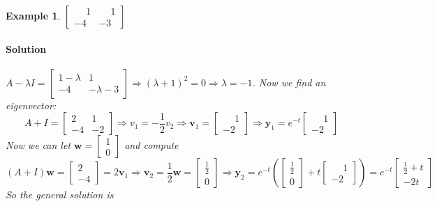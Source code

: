 \documentclass[letterpaper, 11pt, openany]{book}
\theoremstyle{mytheoremstyle}
\theoremstyle{myexamplestyle}
\newtheorem{example}{Example}[section]
\newenvironment{solution}{\paragraph{\sffamily \smaller \fontseries{b}\selectfont Solution}}{\hfill\faSquare}
\begin{document}
\begin{example}\label{e:de-rep-ev-neg}
    \(\begin{bmatrix}
         \phantom{-}1 &  \phantom{-}1 \\
        -4 & -3
    \end{bmatrix}\)
    \begin{solution}
        \(A - \lambda I =\begin{bmatrix}
            1-\lambda  & 1 \\
        -4 & -\lambda -3
        \end{bmatrix} \Rightarrow (\lambda + 1)^{2} = 0 \Rightarrow \lambda = -1\). Now we find an eigenvector:
        \[A + I = \begin{bmatrix}
            2 & 1 \\
            -4 & -2 
        \end{bmatrix} \Rightarrow v_{1} = -\frac{1}{2}v_{2} \Rightarrow \mathbf{v}_{1} = \begin{bmatrix}\phantom{-}1 \\ -2\end{bmatrix} \Rightarrow \mathbf{y}_{1} = e^{-t}\begin{bmatrix}\phantom{-}1 \\ -2\end{bmatrix} \]
        Now we can let \(\mathbf{w} = \begin{bmatrix}1 \\ 0\end{bmatrix}\) and compute
        \[(A + I)\mathbf{w} = \begin{bmatrix}2 \\ -4\end{bmatrix} = 2 \mathbf{v}_{1} \Rightarrow \mathbf{v}_{2} = \frac{1}{2}\mathbf{w} = \begin{bmatrix}\frac{1}{2} \\ 0\end{bmatrix}\Rightarrow \mathbf{y}_{2} = e^{-t}\left(\begin{bmatrix}\frac{1}{2} \\ 0\end{bmatrix} + t \begin{bmatrix}\phantom{-}1 \\ -2\end{bmatrix}\right) = e^{-t} \begin{bmatrix}
            \frac{1}{2} + t\\
            -2t
        \end{bmatrix}\]
        So the general solution is

\end{solution}
\end{example}
\end{document}
